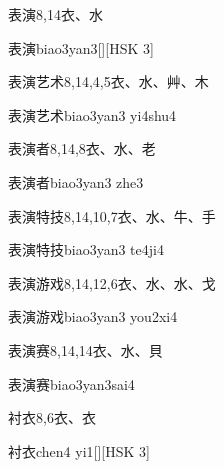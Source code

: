 \begin{entry}{表演}{8,14}{⾐、⽔}
  \begin{phonetics}{表演}{biao3yan3}[][HSK 3]
  \end{phonetics}
\end{entry}

\begin{entry}{表演艺术}{8,14,4,5}{⾐、⽔、⾋、⽊}
  \begin{phonetics}{表演艺术}{biao3yan3 yi4shu4}
  \end{phonetics}
\end{entry}

\begin{entry}{表演者}{8,14,8}{⾐、⽔、⽼}
  \begin{phonetics}{表演者}{biao3yan3 zhe3}
  \end{phonetics}
\end{entry}

\begin{entry}{表演特技}{8,14,10,7}{⾐、⽔、⽜、⼿}
  \begin{phonetics}{表演特技}{biao3yan3 te4ji4}
  \end{phonetics}
\end{entry}

\begin{entry}{表演游戏}{8,14,12,6}{⾐、⽔、⽔、⼽}
  \begin{phonetics}{表演游戏}{biao3yan3 you2xi4}
  \end{phonetics}
\end{entry}

\begin{entry}{表演赛}{8,14,14}{⾐、⽔、⾙}
  \begin{phonetics}{表演赛}{biao3yan3sai4}
  \end{phonetics}
\end{entry}

\begin{entry}{衬衣}{8,6}{⾐、⾐}
  \begin{phonetics}{衬衣}{chen4 yi1}[][HSK 3]
  \end{phonetics}
\end{entry}

